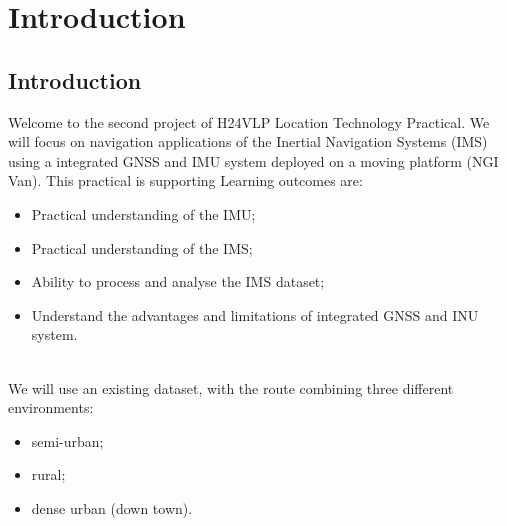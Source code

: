 \documentclass[11pt,fleqn]{book} %
\begin{document}


\pagestyle{empty} %
\tableofcontents %

\cleardoublepage %
\pagestyle{fancy} %


\part{Introduction}


\chapter{Introduction}

Welcome to the second project of H24VLP Location Technology Practical. We will focus on navigation applications of the Inertial Navigation Systems (IMS) using a integrated GNSS and IMU system deployed on a moving platform (NGI Van). This practical is supporting Learning outcomes are:

\begin{itemize}
	\item Practical understanding of the IMU;
	\item Practical understanding of the IMS;
	\item Ability to process and analyse the IMS dataset;
	\item Understand the advantages and limitations of integrated GNSS and INU system.

\end{itemize}

\\We will use an existing dataset, with the route combining three different environments:

\begin{itemize}
	\item semi-urban;
	\item rural;
	\item dense urban (down town).
\end{itemize}
\end{document}
